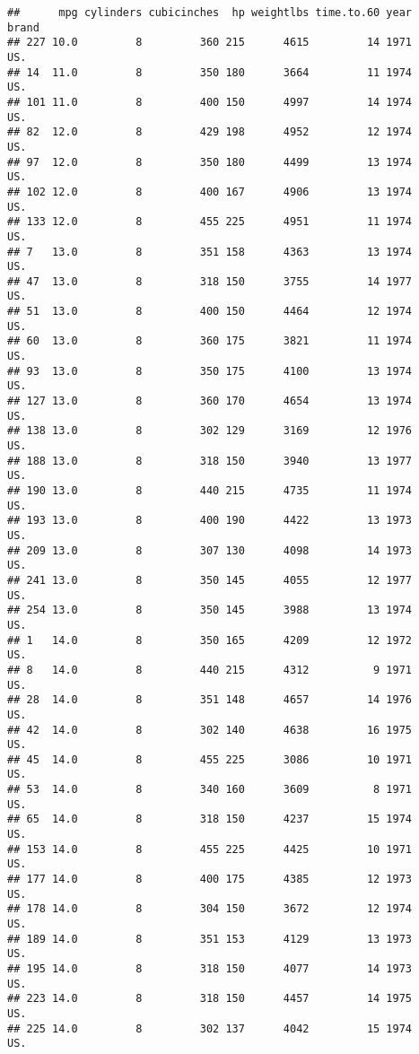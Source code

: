 \documentclass[11pt,]{article}
\begin{document}
\begin{verbatim}
##      mpg cylinders cubicinches  hp weightlbs time.to.60 year    brand
## 227 10.0         8         360 215      4615         14 1971      US.
## 14  11.0         8         350 180      3664         11 1974      US.
## 101 11.0         8         400 150      4997         14 1974      US.
## 82  12.0         8         429 198      4952         12 1974      US.
## 97  12.0         8         350 180      4499         13 1974      US.
## 102 12.0         8         400 167      4906         13 1974      US.
## 133 12.0         8         455 225      4951         11 1974      US.
## 7   13.0         8         351 158      4363         13 1974      US.
## 47  13.0         8         318 150      3755         14 1977      US.
## 51  13.0         8         400 150      4464         12 1974      US.
## 60  13.0         8         360 175      3821         11 1974      US.
## 93  13.0         8         350 175      4100         13 1974      US.
## 127 13.0         8         360 170      4654         13 1974      US.
## 138 13.0         8         302 129      3169         12 1976      US.
## 188 13.0         8         318 150      3940         13 1977      US.
## 190 13.0         8         440 215      4735         11 1974      US.
## 193 13.0         8         400 190      4422         13 1973      US.
## 209 13.0         8         307 130      4098         14 1973      US.
## 241 13.0         8         350 145      4055         12 1977      US.
## 254 13.0         8         350 145      3988         13 1974      US.
## 1   14.0         8         350 165      4209         12 1972      US.
## 8   14.0         8         440 215      4312          9 1971      US.
## 28  14.0         8         351 148      4657         14 1976      US.
## 42  14.0         8         302 140      4638         16 1975      US.
## 45  14.0         8         455 225      3086         10 1971      US.
## 53  14.0         8         340 160      3609          8 1971      US.
## 65  14.0         8         318 150      4237         15 1974      US.
## 153 14.0         8         455 225      4425         10 1971      US.
## 177 14.0         8         400 175      4385         12 1973      US.
## 178 14.0         8         304 150      3672         12 1974      US.
## 189 14.0         8         351 153      4129         13 1973      US.
## 195 14.0         8         318 150      4077         14 1973      US.
## 223 14.0         8         318 150      4457         14 1975      US.
## 225 14.0         8         302 137      4042         15 1974      US.

\end{verbatim}
\end{document}
